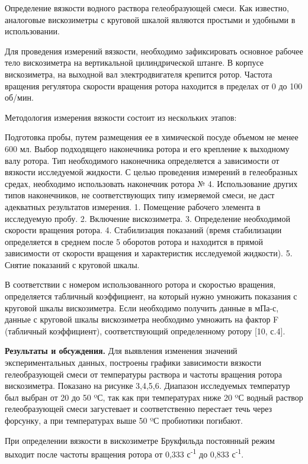 Определение вязкости водного раствора гелеобразующей смеси. Как
известно, аналоговые вискозиметры с круговой шкалой являются простыми и
удобными в использовании.

Для проведения измерений вязкости, необходимо зафиксировать основное
рабочее тело вискозиметра на вертикальной цилиндрической штанге. В
корпусе вискозиметра, на выходной вал электродвигателя крепится ротор.
Частота вращения регулятора скорости вращения ротора находится в
пределах от 0 до 100 об/мин.

Методология измерения вязкости состоит из нескольких этапов:

Подготовка пробы, путем размещения ее в химической посуде объемом не
менее 600 мл. Выбор подходящего наконечника ротора и его крепление к
выходному валу ротора. Тип необходимого наконечника определяется а
зависимости от вязкости исследуемой жидкости. С целью проведения
измерений в гелеобразных средах, необходимо использовать наконечник
ротора № 4. Использование других типов наконечников, не соответствующих
типу измеряемой смеси, не даст адекватных результатов измерения. 1.
Помещение рабочего элемента в исследуемую пробу. 2. Включение
вискозиметра. 3. Определение необходимой скорости вращения ротора. 4.
Стабилизация показаний (время стабилизации определяется в среднем после
5 оборотов ротора и находится в прямой зависимости от скорости вращения
и характеристик исследуемой жидкости). 5. Снятие показаний с круговой
шкалы.

В соответствии с номером использованного ротора и скоростью вращения,
определяется табличный коэффициент, на который нужно умножить показания
с круговой шкалы вискозиметра. Если необходимо получить данные в мПа-с,
данные с круговой шкалы вискозиметра необходимо умножить на фактор F
(табличный коэффициент), соответствующий определенному ротору {[}10,
с.4{]}.

{\bfseries Результаты и обсуждения.} Для выявления изменения значений
экспериментальных данных, построены графики зависимости вязкости
гелеобразующей смеси от температуры раствора и частоты вращения ротора
вискозиметра. Показано на рисунке 3,4,5,6. Диапазон исследуемых
температур был выбран от 20 до 50 ºС, так как при температурах ниже 20
ºС водный раствор гелеобразующей смеси загустевает и соответственно
перестает течь через форсунку, а при температурах выше 50 ºС пробиотики
погибают.

При определении вязкости в вискозиметре Брукфильда постоянный режим
выходит после частоты вращения ротора от 0,333 с\textsuperscript{-1} до
0,833 с\textsuperscript{-1}.

